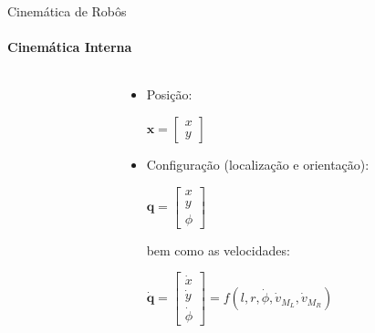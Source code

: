 \documentclass{beamer}
\begin{document}
\begin{frame}{Cinemática de Robôs}
    \framesubtitle{Cinemática Interna}
    \begin{columns}
        \begin{column}[c]{0.5\textwidth}
            \centering
            
        \end{column}
        \begin{column}[c]{0.5\textwidth}
            \centering
            \begin{itemize}
                \item Posição:
                \newline
                
                $\mathbf{x} = \begin{bmatrix}
                    x \\
                    y
                \end{bmatrix}$
                \newline

                \item Configuração (localização e orientação):
                \newline

                $\mathbf{q} = 
                \begin{bmatrix}
                    x \\
                    y\\
                    \phi
                \end{bmatrix}$
                \newline

                bem como as velocidades:
                \newline

                $\dot{\mathbf{q}} = 
                \begin{bmatrix}
                    \dot{x} \\
                    \dot{y}\\
                    \dot{\phi}
                \end{bmatrix} =
                f(l, r, \dot{\phi}, \dot{v}_{M_L}, \dot{v}_{M_R})$            
        \end{itemize}
        \end{column}
    \end{columns}   
\end{frame}
\end{document}
